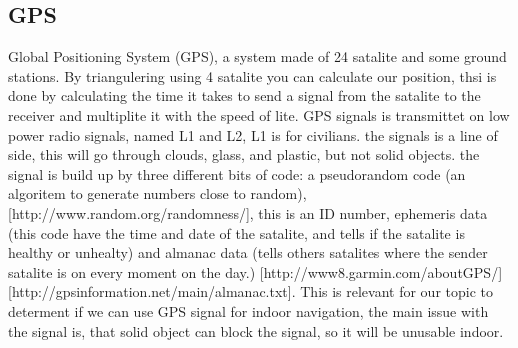 \subsection{GPS}
Global Positioning System (GPS), a system made of 24 satalite and some ground stations. By triangulering using 4 satalite you can calculate our position, thsi is done by calculating the time it takes to send a signal from the satalite  to  the receiver and multiplite it with the speed of lite. GPS signals is transmittet on low power radio signals, named L1 and L2, L1 is for civilians. the signals is a line of side, this will go through clouds, glass, and plastic, but not solid objects. the signal is build up by three different bits of code: a pseudorandom code (an algoritem to generate numbers close to random), [http://www.random.org/randomness/], this is an ID number, ephemeris data (this code have the time and date of the satalite, and tells if the satalite  is healthy or unhealty) and almanac data (tells others satalites where the sender satalite is on every moment on the day.) [http://www8.garmin.com/aboutGPS/] [http://gpsinformation.net/main/almanac.txt]. This is relevant for our topic to determent if we  can use GPS signal for indoor navigation, the main issue with the signal is, that solid object can block the signal, so it will be unusable indoor. 